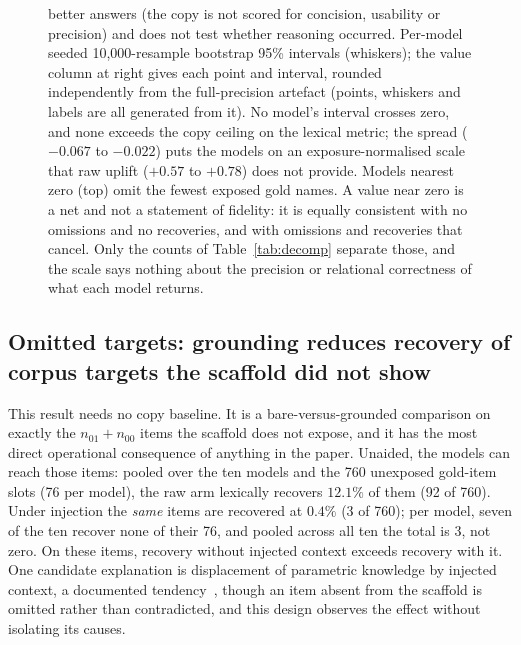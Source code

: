 \documentclass[10pt,twocolumn]{article}
\begin{document}
\begin{figure}[t]
{better answers (the copy is not scored for concision, usability or precision) and does not test whether
reasoning occurred. Per-model seeded
10{,}000-resample bootstrap 95\% intervals (whiskers); the value column at right gives each point and
interval, rounded independently from the full-precision artefact (points, whiskers and labels are all
generated from it). No model's interval crosses zero, and none exceeds the copy ceiling on the lexical
metric; the spread ($-0.067$ to $-0.022$) puts the models on an exposure-normalised scale that raw
uplift ($+0.57$ to $+0.78$) does not provide. Models nearest zero (top) omit the fewest exposed gold names.
A value near zero is a net and not a statement of fidelity: it is equally consistent with no omissions
and no recoveries, and with omissions and recoveries that cancel. Only the counts of
Table~\ref{tab:decomp} separate those, and the scale says nothing about the precision or relational
correctness of what each model returns.}
\label{fig:gain}
\end{figure}

\subsection{Omitted targets: grounding reduces recovery of corpus targets the scaffold did not show}\label{sec:suppression}
This result needs no copy baseline. It is a bare-versus-grounded comparison on exactly the $n_{01}+n_{00}$ items the scaffold does not expose, and it has the most direct operational consequence of anything in the paper. Unaided, the models can reach those items: pooled over the ten models and the 760 unexposed gold-item slots (76 per model), the raw arm lexically recovers $\mathbf{12.1\%}$ of them (92 of 760). Under injection the \emph{same} items are recovered at $\mathbf{0.4\%}$ (3 of 760); per model, seven of the ten recover none of their 76, and pooled across all ten the total is 3, not zero. On these items, recovery without injected context exceeds recovery with it. One candidate explanation is displacement of parametric knowledge by injected context, a documented tendency~\cite{shi2023distracted,yoran2024robust,longpre2021entity}, though an item absent from the scaffold is omitted rather than contradicted, and this design observes the effect without isolating its causes.
\end{document}
